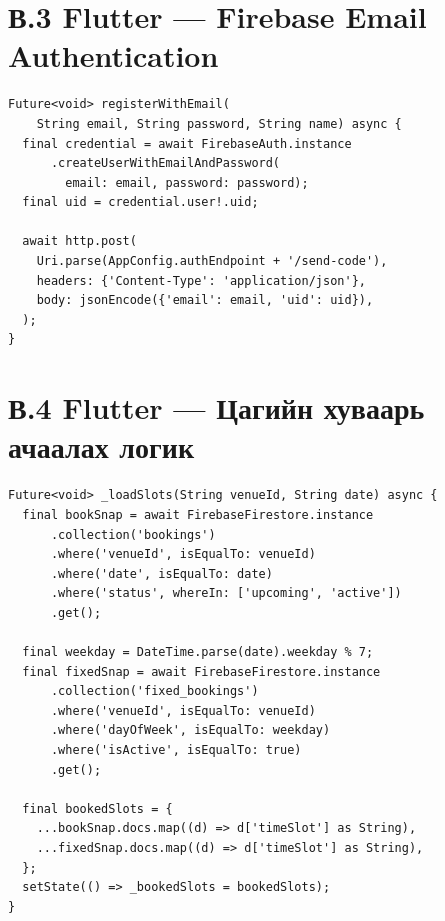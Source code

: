 
\section*{В.3 Flutter --- Firebase Email Authentication}

\begin{lstlisting}[language={}, caption={lib/services/auth\_service.dart --- бүртгэлийн логик}, label={lst:auth}]
Future<void> registerWithEmail(
    String email, String password, String name) async {
  final credential = await FirebaseAuth.instance
      .createUserWithEmailAndPassword(
        email: email, password: password);
  final uid = credential.user!.uid;

  await http.post(
    Uri.parse(AppConfig.authEndpoint + '/send-code'),
    headers: {'Content-Type': 'application/json'},
    body: jsonEncode({'email': email, 'uid': uid}),
  );
}
\end{lstlisting}


\section*{В.4 Flutter --- Цагийн хуваарь ачаалах логик}

\begin{lstlisting}[language={}, caption={lib/screens/booking\_screen.dart --- захиалагдсан цагийн үеийг тооцоолох}, label={lst:slots}]
Future<void> _loadSlots(String venueId, String date) async {
  final bookSnap = await FirebaseFirestore.instance
      .collection('bookings')
      .where('venueId', isEqualTo: venueId)
      .where('date', isEqualTo: date)
      .where('status', whereIn: ['upcoming', 'active'])
      .get();

  final weekday = DateTime.parse(date).weekday % 7;
  final fixedSnap = await FirebaseFirestore.instance
      .collection('fixed_bookings')
      .where('venueId', isEqualTo: venueId)
      .where('dayOfWeek', isEqualTo: weekday)
      .where('isActive', isEqualTo: true)
      .get();

  final bookedSlots = {
    ...bookSnap.docs.map((d) => d['timeSlot'] as String),
    ...fixedSnap.docs.map((d) => d['timeSlot'] as String),
  };
  setState(() => _bookedSlots = bookedSlots);
}
\end{lstlisting}

